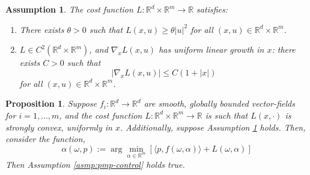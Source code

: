 \documentclass[10pt,a4paper]{amsart}
\newtheorem{assumption}{Assumption}
\newtheorem{proposition}{Proposition}
\begin{document}
\begin{assumption}
\label{asmp:cost}
The cost function $L: \mathbb{R}^d \times \mathbb{R}^m \rightarrow \mathbb{R}$ satisfies:
\begin{enumerate}
\item There exists $\theta > 0$ such that $L(x,u) \geq \theta |u|^2$ for all $(x,u) \in \mathbb{R}^d \times \mathbb{R}^m$.
\item $L \in C^2(\mathbb{R}^d \times \mathbb{R}^m)$, and $\nabla_x L(x, u)$ has uniform linear growth in $x$: there exists $C > 0$ such that
\[|\nabla_x L(x, u)| \leq C(1 + |x|)\]
for all $(x, u) \in \mathbb{R}^d \times \mathbb{R}^m$.
\end{enumerate}
\end{assumption}

\begin{proposition}
    Suppose $f_i :\mathbb{R}^d \rightarrow \mathbb{R}^d$ are smooth, globally bounded vector-fields for $i =1,...,m$, and the cost function $L: \mathbb{R}^d \times \mathbb{R}^m \rightarrow \mathbb{R}$ is such that $L(x, \cdot )$ is strongly convex, uniformly in $x$. Additionally, suppose Assumption \ref{asmp:cost} holds. Then, consider the function,
    \[\alpha(\omega,p) := \arg\min_{\alpha \in \mathbb{R}^m} \left[\langle p, f(\omega,\alpha) \rangle + L(\omega,\alpha)\right]\]
    Then Assumption \ref{asmp:pmp-control} holds true.
    \label{prop:relaass}
\end{proposition}
\end{document}
